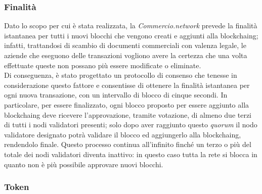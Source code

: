 \subsubsection*{Finalità}

Dato lo scopo per cui è stata realizzata, la \textit{Commercio.network} prevede la finalità istantanea per tutti i nuovi blocchi che vengono creati e aggiunti alla \gls{blockchaing}; infatti, trattandosi di scambio di documenti commerciali con valenza legale, le aziende che eseguono delle transazioni vogliono avere la certezza che una volta effettuate queste non possano più essere modificate o eliminate.\\
Di conseguenza, è stato progettato un protocollo di consenso che tenesse in considerazione questo fattore e consentisse di ottenere la finalità istantanea per ogni nuova transazione, con un intervallo di blocco di cinque secondi. In particolare, per essere finalizzato, ogni blocco proposto per essere aggiunto alla \gls{blockchaing} deve ricevere l'approvazione, tramite votazione, di almeno due terzi di tutti i nodi validatori presenti; solo dopo aver raggiunto questo \textit{quorum} il nodo validatore designato potrà validare il blocco ed aggiungerlo alla \gls{blockchaing}, rendendolo finale. Questo processo continua all'infinito finché un terzo o più del totale dei nodi validatori diventa inattivo: in questo caso tutta la rete si blocca in quanto non è più possibile approvare nuovi blocchi. 

\subsubsection*{Token}

